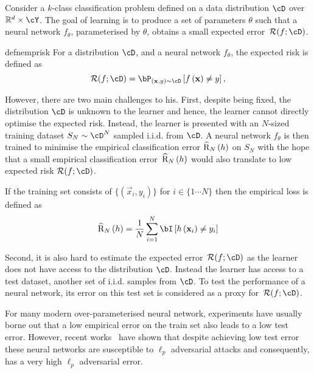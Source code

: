Consider a $k$-class classification problem defined on a data distribution
\(\cD\) over \(\reals^d\times\cY\). The goal of learning is to produce a set of
parameters \(\theta\) such that a neural network \(f_{\theta}\), parameterised
by \(\theta\), obtains a small expected error~\(\risk{\cD}{f}\).

\begin{restatable}{defn}{emprisk}
    \label{defn:exp_loss}
    For a distribution $\cD$, and a neural network $f_\theta$, the expected risk
    is defined as 
  \[  \risk{\cD}{f}=\bP_{\br{\vec{x},y}\sim\cD}\bs{f\br{\vec{x}}\neq y},\]
  \end{restatable}

However, there are two main challenges to his. First, despite being fixed, the
distribution \(\cD\) is unknown to the learner and hence, the learner cannot
directly optimise the expected risk. Instead, the learner is presented with an
$N$-sized training dataset \(S_N \sim \cD^N\) sampled i.i.d. from \(\cD\). A neural
network \(f_\theta\) is then trained to minimise the empirical classification
error \(\empRisk{h}{N}\) on \(S_N\) with the hope that a small empirical
classification error~\(\empRisk{h}{N}\) would also translate to low expected
risk \(\risk{\cD}{f}\). 
\begin{defn}
    \label{defn:emp_loss}
    If the training set consists of $\{(\vec{x}_i, y_i)\}$ for $i \in \{1\cdots
    N\}$ then the empirical loss is defined as
    \[\empRisk{h}{N} = \frac{1}{N} \sum_{i=1}^N \bI\bs{h\br{\vec{x}_i} \neq y_i}\]
  \end{defn}

  Second, it is also hard to estimate the expected error~\(\risk{\cD}{f}\) as
  the learner does not have access to the distribution \(\cD\). Instead the
  learner has access to a test dataset, another set of i.i.d. samples from
  \(\cD\). To test the performance of a neural network, its error on this test set is considered as a proxy for~\(\risk{\cD}{f}\).
   
  For many modern over-parameterised neural network, experiments have usually
  borne out that a low empirical error on the train set also leads to a low test
  error. However, recent
  works~\citep{goodfellow2014explaining,szegedy2013intriguing} have shown that
  despite achieving low test error these neural networks are susceptible to
  \(\ell_p\) adversarial attacks and consequently, has a very high \(\ell_p\)
  adversarial error.

